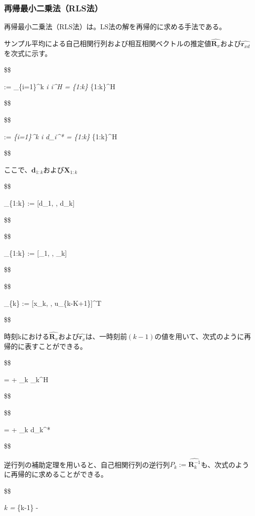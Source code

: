 \hypertarget{ux518dux5e30ux6700ux5c0fux4e8cux4e57ux6cd5rlsux6cd5}{%
\subsubsection{再帰最小二乗法（RLS法）}\label{ux518dux5e30ux6700ux5c0fux4e8cux4e57ux6cd5rlsux6cd5}}

再帰最小二乗法（RLS法）は。LS法の解を再帰的に求める手法である。

サンプル平均による自己相関行列および相互相関ベクトルの推定値\(\hat{\bm{R}_x}\)および\(\hat{\bm{r}_{xd}}\)を次式に示す。

\$\$

 := \sum\_\{i=1\}\^{}k \emph{i \emph{i\^{}H =
}\{1:k\} }\{1:k\}\^{}H

\$\$

\$\$

 := \sum\emph{\{i=1\}\^{}k \emph{i d\_i\^{}* =
}\{1:k\} }\{1:k\}\^{}H

\$\$

ここで、\(\bm{d}_{1:k}\)および\(\bm{X}_{1:k}\)

\$\$

\_\{1:k\} := {[}d\_1, \cdots, d\_k{]}

\$\$

\$\$

\_\{1:k\} := {[}\_1, \cdots, \_k{]}

\$\$

\$\$

\_\{k\} := {[}x\_k, \cdots, u\_\{k-K+1\}{]}\^{}T

\$\$

時刻kにおける\(\hat{\bm{R}_x}\)および\(\hat{\bm{r}_x}\)は、一時刻前\((k-1)\)の値を用いて、次式のように再帰的に表すことができる。

\$\$

 =  + \_k \_k\^{}H

\$\$

\$\$

 =  + \_k d\_k\^{}*

\$\$

逆行列の補助定理を用いると、自己相関行列の逆行列\(P_k := \hat{\bm{R}_k^{-1}}\)も、次式のように再帰的に求めることができる。

\$\$

\emph{k = }\{k-1\} -

